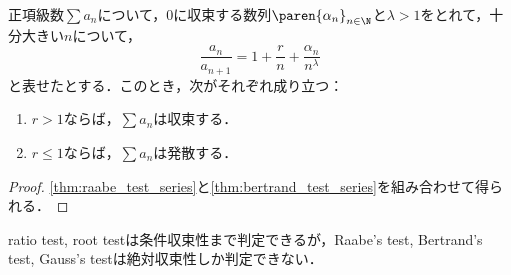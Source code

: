 \documentclass[a4paper,10pt]{ltjsarticle}
\begin{document}
\begin{MyTheorem}
  正項級数\(\sum a_n\)について，\(0\)に収束する数列\(\paren{\alpha_n}_{n\in\N}\)と\(\lambda > 1\)をとれて，十分大きい\(n\)について，
  \[ \frac{a_n}{a_{n+1}} = 1 + \frac{r}{n} + \frac{\alpha_n}{n^\lambda} \]
  と表せたとする．このとき，次がそれぞれ成り立つ：
  \begin{enumerate}
    \item \(r > 1\)ならば，\(\sum a_n\)は収束する．
    \item \(r \le 1\)ならば，\(\sum a_n\)は発散する．
  \end{enumerate}
\end{MyTheorem}
\begin{proof}
  \cref{thm:raabe_test_series}と\cref{thm:bertrand_test_series}を組み合わせて得られる．
\end{proof}

ratio test, root testは条件収束性まで判定できるが，Raabe's test, Bertrand's test, Gauss's testは絶対収束性しか判定できない．
\end{document}
